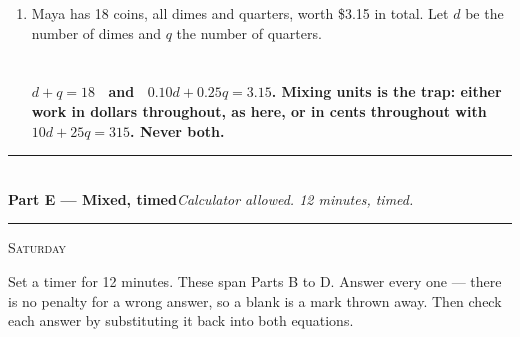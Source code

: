 \documentclass[11pt,a4paper]{article}
\newif\ifANSWERS
\newcommand{\PartHead}[2]{%
  \vspace{6pt}
  {\color{navy}\rule{\textwidth}{0.8pt}}\\[2pt]
  {\large\bfseries\color{navy}#1}\hfill{\small\itshape #2}\\[-4pt]
  {\color{navy}\rule{\textwidth}{0.4pt}}
  \vspace{4pt}
}
\newcommand{\sitting}[1]{{\footnotesize\textsc{\color{navy}#1}}\par\vspace{2pt}}
\newcommand{\ans}[1]{\ {\color{keyred}\bfseries #1}}
\newcommand{\ans}[1]{}
\begin{document}
\begin{enumerate}[leftmargin=20pt,itemsep=11pt]
\item Maya has 18 coins, all dimes and quarters, worth \$3.15 in total. Let $d$ be the number of dimes and $q$ the number of quarters.\\
  \underline{\hspace{\linewidth}}\\[4pt]
  \underline{\hspace{\linewidth}}
  \ans{\\ $d+q=18$ \ and \ $0.10d+0.25q=3.15$. Mixing units is the trap: either work in dollars throughout, as here, or in cents throughout with $10d+25q=315$. Never both.}

\end{enumerate}

\ifANSWERS\else\newpage\fi
\PartHead{Part E --- Mixed, timed}{Calculator allowed. 12 minutes, timed.}
\sitting{Saturday}
Set a timer for 12 minutes. These span Parts B to D. Answer every one --- there is no
penalty for a wrong answer, so a blank is a mark thrown away. Then check each answer
by substituting it back into both equations.
\end{document}
